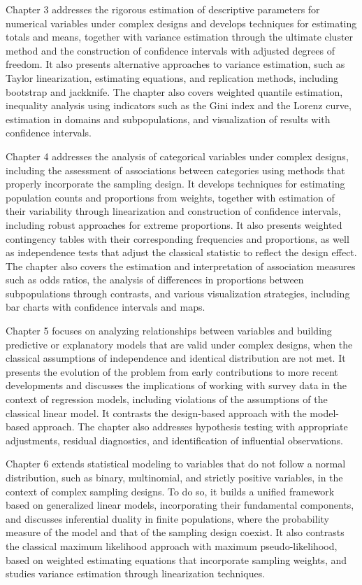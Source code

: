 \documentclass[
  english,
  12pt,
]{book}
\begin{document}
Chapter 3 addresses the rigorous estimation of descriptive parameters for numerical variables under complex designs and develops techniques for estimating totals and means, together with variance estimation through the ultimate cluster method and the construction of confidence intervals with adjusted degrees of freedom. It also presents alternative approaches to variance estimation, such as Taylor linearization, estimating equations, and replication methods, including bootstrap and jackknife. The chapter also covers weighted quantile estimation, inequality analysis using indicators such as the Gini index and the Lorenz curve, estimation in domains and subpopulations, and visualization of results with confidence intervals.

Chapter 4 addresses the analysis of categorical variables under complex designs, including the assessment of associations between categories using methods that properly incorporate the sampling design. It develops techniques for estimating population counts and proportions from weights, together with estimation of their variability through linearization and construction of confidence intervals, including robust approaches for extreme proportions. It also presents weighted contingency tables with their corresponding frequencies and proportions, as well as independence tests that adjust the classical statistic to reflect the design effect. The chapter also covers the estimation and interpretation of association measures such as odds ratios, the analysis of differences in proportions between subpopulations through contrasts, and various visualization strategies, including bar charts with confidence intervals and maps.

Chapter 5 focuses on analyzing relationships between variables and building predictive or explanatory models that are valid under complex designs, when the classical assumptions of independence and identical distribution are not met. It presents the evolution of the problem from early contributions to more recent developments and discusses the implications of working with survey data in the context of regression models, including violations of the assumptions of the classical linear model. It contrasts the design-based approach with the model-based approach. The chapter also addresses hypothesis testing with appropriate adjustments, residual diagnostics, and identification of influential observations.

Chapter 6 extends statistical modeling to variables that do not follow a normal distribution, such as binary, multinomial, and strictly positive variables, in the context of complex sampling designs. To do so, it builds a unified framework based on generalized linear models, incorporating their fundamental components, and discusses inferential duality in finite populations, where the probability measure of the model and that of the sampling design coexist. It also contrasts the classical maximum likelihood approach with maximum pseudo-likelihood, based on weighted estimating equations that incorporate sampling weights, and studies variance estimation through linearization techniques.
\end{document}

